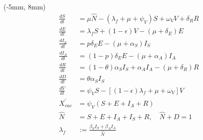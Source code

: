 \begin{frame}
    \begin{textblock*}{80mm}(-5mm, 8mm)
        \begin{align*}
            \frac{d S}{dt}
                &=
                \mu \widehat{N}
                - (\lambda_f + \mu + \psi_V) S
                + \omega_V V + \delta_R R
            \\
            \frac{d E}{dt}
                &=
                \lambda_f S +
                (1- \epsilon) V - (\mu + \delta_E) E
            \\
            \frac{d I_S}{dt}
            &=
                p \delta_E E - (\mu + \alpha_S) I_S
            \\
            \frac{d I_A}{dt}
            &= (1- p)\delta_E E
                - (\mu + \alpha_A)I_A
            \\
            \frac{d R}{dt}
                &= (1 - \theta) \alpha_S I_S
                + \alpha_A I_A
                -(\mu + \delta_R) R
            \\
            \frac{d D}{dt}
            &=  \theta \alpha_S I_S
            \\
            \frac{d V}{dt}
                &= \psi_V S -
                \left[
                    (1 - \epsilon ) \lambda_f + \mu + \omega _V
                \right] V
            \\
            X_{vac}^{\prime} &= \psi_V (S + E + I_A + R)
            \\
            \widehat{N} &= S +E+ I_A + I_S + R, \quad
            \widehat{N} + D = 1
            \\
            \lambda_f &:= \frac{\beta_S I_S + \beta_A I_A}{\widehat{N}}
        \end{align*}
    \end{textblock*}
\end{frame}


